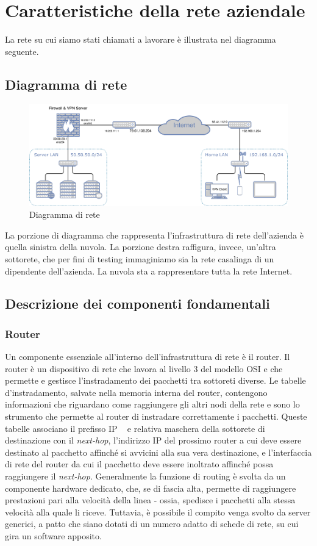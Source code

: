 \section{Caratteristiche della rete aziendale}
La rete su cui siamo stati chiamati a lavorare è illustrata nel diagramma seguente.
\subsection{Diagramma di rete}
\begin{figure}[h]
    \centering
    \includegraphics[width=14cm]{figure/networkDiagram.pdf}
    \caption{Diagramma di rete}
\end{figure}
La porzione di diagramma che rappresenta l'infrastruttura di rete dell'azienda è quella sinistra della nuvola. La porzione destra raffigura, invece, un'altra sottorete, che per fini di testing immaginiamo sia la rete casalinga di un dipendente dell'azienda. La nuvola sta a rappresentare tutta la rete Internet.

\subsection{Descrizione dei componenti fondamentali}
\subsubsection{Router}
Un componente essenziale all'interno dell'infrastruttura di rete è il router. Il router è un dispositivo di rete che lavora al livello 3 del modello OSI e che permette e gestisce l'instradamento dei pacchetti tra sottoreti diverse.
Le tabelle d'instradamento, salvate nella memoria interna del router, contengono informazioni che riguardano come raggiungere gli altri nodi della rete e sono lo strumento che permette al router di instradare correttamente i pacchetti.
Queste tabelle associano il prefisso IP ~\cite[RFC0791]{RFC0791} e relativa maschera della sottorete di destinazione con il \emph{next-hop}, l'indirizzo IP del prossimo router a cui deve essere destinato al pacchetto affinché si avvicini alla sua vera destinazione, e l'interfaccia di rete del router da cui il pacchetto deve essere inoltrato affinché possa raggiungere il \emph{next-hop}.
Generalmente la funzione di routing è svolta da un componente hardware dedicato, che, se di fascia alta, permette di raggiungere prestazioni pari alla velocità della linea - ossia, spedisce i pacchetti alla stessa velocità alla quale li riceve.
Tuttavia, è possibile il compito venga svolto da server generici, a patto che siano dotati di un numero adatto di schede di rete, su cui gira un software apposito.

